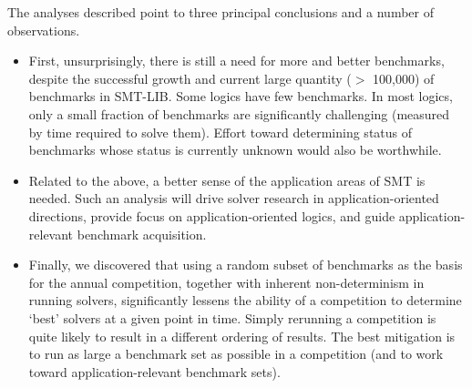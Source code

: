 \documentclass[smallcondensed]{svjour3}
\begin{document}
The analyses described point to three principal conclusions and a number of observations.
\begin{itemize}
\item First, unsurprisingly, there is still a need for more and better benchmarks, despite the successful growth and current large quantity ($>$ 100,000) of benchmarks in SMT-LIB. Some logics have few benchmarks. In most logics, only a small fraction of benchmarks are significantly challenging (measured by time required to solve them).
Effort toward determining status of benchmarks whose status is currently unknown would also be worthwhile.
\item Related to the above, a better sense of the application areas of SMT is needed. Such an analysis will drive solver research in application-oriented directions, provide focus on application-oriented logics, and guide application-relevant benchmark acquisition.
\item Finally, we discovered that using a random subset of benchmarks as the basis for the annual competition, together with inherent non-determinism in running solvers, significantly lessens the ability of a competition to determine `best' solvers at a given point in time. Simply rerunning a competition is quite likely to result in a different ordering of results. The best mitigation is to run as large a benchmark set as possible in a competition (and to work toward application-relevant benchmark sets).
\end{itemize}
\end{document}
